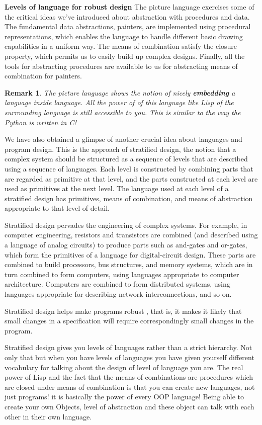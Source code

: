 \documentclass[a4paper,twoside]{article}
\newtheorem{remark}[theorem]{Remark}
\numberwithin{equation}{section}
\begin{document}
\textbf{Levels of language for robust design}\newline
The picture language exercises some of the critical ideas we've introduced about abstraction with
procedures and data. The fundamental data abstractions, painters, are implemented using procedural
representations, which enables the language to handle different basic drawing capabilities in a
uniform way. The means of combination satisfy the closure property, which permits us to easily
build up complex designs.
Finally, all the tools for abstracting procedures are available to us for
abstracting means of combination for painters.
\begin{remark}
    The picture language shows the notion of nicely \textbf{embedding} a language inside language.
    All the power of of this language like Lisp of the surrounding language is still accessible to
    you. This is similar to the way the Python is written in C!
\end{remark}
We have also obtained a glimpse of another crucial idea about languages and program design. This is
the approach of stratified design, the notion that a complex system should be structured as a
sequence of levels that are described using a sequence of languages. Each level is constructed by
combining parts that are regarded as primitive at that level, and the parts constructed at each level
are used as primitives at the next level. The language used at each level of a stratified design
has primitives, means of combination, and means of abstraction appropriate
to that level of detail.

Stratified design pervades the engineering of complex systems. For example, in computer engineering,
resistors and transistors are combined (and described using a language of analog circuits) to produce
parts such as and-gates and or-gates, which form the primitives of a language for digital-circuit design.
These parts are combined to build processors, bus structures, and memory systems, which are in turn
combined to form computers, using languages appropriate to computer architecture. Computers are
combined to form distributed systems, using
languages appropriate for describing network interconnections, and so
on.

Stratified design helps make programs robust , that is, it makes it
likely that small changes in a specification will require correspondingly
small changes in the program.

Stratified design gives you levels of languages rather than a strict hierarchy. Not only that but when you have levels of languages you have given yourself different vocabulary for talking about the design of level of language you are. The real power of Lisp and the fact that the means of combinations are procedures which are closed under means of combination is that you can create new languages, not just programs! it is basically the power of every OOP language! Being able to create your own Objects, level of abstraction and these object can talk with each other in their own language.
\end{document}
